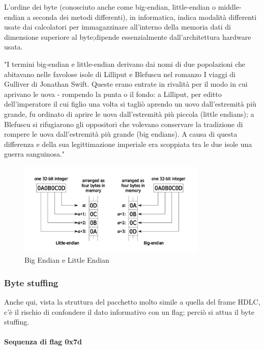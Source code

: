 L'ordine dei byte (conosciuto anche come big-endian, little-endian o middle-endian a seconda dei metodi differenti), in informatica, indica modalità differenti usate dai calcolatori per immagazzinare all'interno della memoria dati di dimensione superiore al byte;dipende essenzialmente dall'architettura hardware usata.

"I termini big-endian e little-endian derivano dai nomi di due popolazioni che abitavano nelle favolose isole di Lilliput e Blefuscu nel romanzo I viaggi di Gulliver di Jonathan Swift. Queste erano entrate in rivalità per il modo in cui aprivano le uova - rompendo la punta o il fondo: a Lilliput, per editto dell'imperatore il cui figlio una volta si tagliò aprendo un uovo dall'estremità più grande, fu ordinato di aprire le uova dall'estremità più piccola (little endians); a Blefuscu si rifugiarono gli oppositori che volevano conservare la tradizione di rompere le uova dall'estremità più grande (big endians). A causa di questa differenza e della sua legittimazione imperiale era scoppiata tra le due isole una guerra sanguinosa."

\begin{figure}[htbp]
    \centering
    \includegraphics[width=0.8\textwidth]{images/endian.png}
    \caption{Big Endian e Little Endian}
    \label{fig:endian}
\end{figure}
\newpage

    \subsubsection{Byte stuffing}


    Anche qui, vista la struttura del pacchetto molto simile a quella del frame HDLC, c'è il rischio di confondere il dato informativo con un flag; perciò si attua il byte stuffing.

    \paragraph{Sequenza di flag 0x7d}

